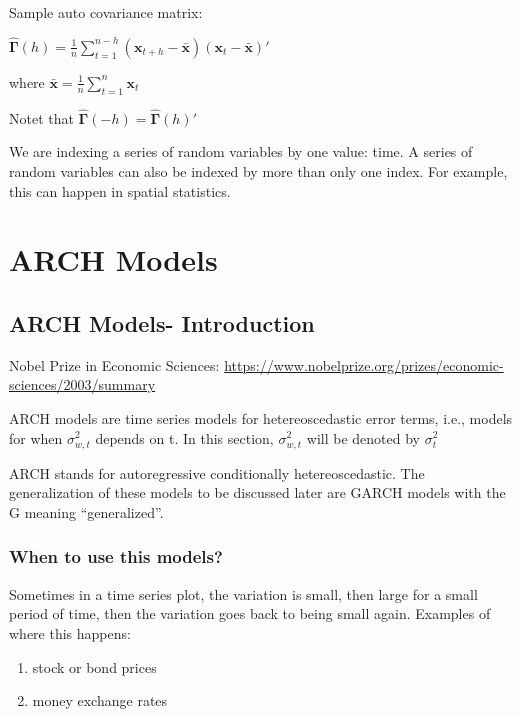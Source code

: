 \documentclass[
]{book}
\providecommand{\tightlist}{%
  \setlength{\itemsep}{0pt}\setlength{\parskip}{0pt}}
\theoremstyle{definition}
\theoremstyle{definition}
\theoremstyle{definition}
\theoremstyle{definition}
\theoremstyle{remark}
\begin{document}
Sample auto covariance matrix:

\(\boldsymbol{\hat \Gamma}(h)=\frac1n\sum_{t=1}^{n-h}(\boldsymbol x_{t+h}-\boldsymbol{\bar x})(\boldsymbol x_t-\boldsymbol{\bar x})'\)

where \(\boldsymbol{\bar x}=\frac1n \sum_{t=1}^{n}\boldsymbol x_t\)

Notet that \(\boldsymbol{\hat \Gamma}(-h)=\boldsymbol{\hat \Gamma}(h)'\)

We are indexing a series of random variables by one value: time. A series of random variables can also be indexed by more than only one index. For example, this can happen in spatial statistics.

\hypertarget{arch-models}{%
\chapter{ARCH Models}\label{arch-models}}

\hypertarget{arch-models--introduction}{%
\section{ARCH Models- Introduction}\label{arch-models--introduction}}

Nobel Prize in Economic Sciences: \url{https://www.nobelprize.org/prizes/economic-sciences/2003/summary}

ARCH models are time series models for hetereoscedastic error terms, i.e., models for when \(\sigma^2_{w,t}\) depends on t. In this section, \(\sigma^2_{w,t}\) will be denoted by \(\sigma^2_t\)

ARCH stands for autoregressive conditionally hetereoscedastic. The generalization of these models to be discussed later are GARCH models with the G meaning ``generalized''.

\hypertarget{when-to-use-this-models}{%
\subsection{When to use this models?}\label{when-to-use-this-models}}

Sometimes in a time series plot, the variation is small, then large for a small period of time, then the variation goes back to being small again. Examples of where this happens:

\begin{enumerate}
\def\labelenumi{\arabic{enumi}.}
\tightlist
\item
  stock or bond prices
\item
  money exchange rates
\end{enumerate}
\end{document}
